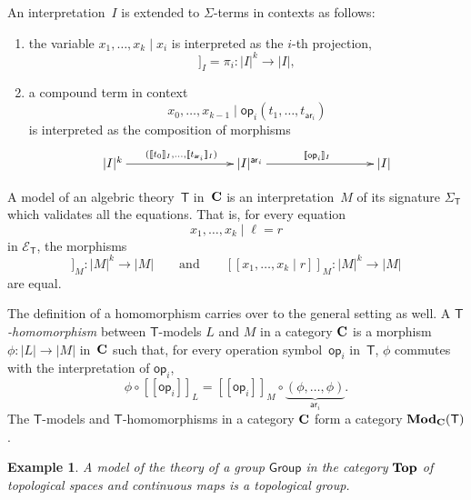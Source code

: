\documentclass{amsart}
\newcommand{\theory}[1]{\mathsf{#1}} %
\newcommand{\signature}[1]{\Sigma_{\theory{#1}}} %
\newcommand{\equations}[1]{\mathcal{E}_{\theory{#1}}} %
\newcommand{\ModC}[2]{\text{\textbf{Mod}}_{\category{#1}}(\theory{#2})} %
\newcommand{\category}[1]{\text{\textbf{#1}}} %
\newcommand{\op}[1]{\mathsf{op}_{#1}} %
\newcommand{\arity}[1]{\mathsf{ar}_{#1}} %
\newcommand{\sem}[1]{[\![#1]\!]} %
\newtheorem{example}[definition]{Example}
\begin{document}
An interpretation~$I$ is extended to $\Sigma$-terms in contexts as follows:
%
\begin{enumerate}
\item the variable $x_1, \ldots, x_k \mid x_i$ is interpreted as the $i$-th projection,
  \begin{equation*}
    \sem{x_0, \ldots, x_{k-1} \mid  x_i}_I = \pi_i : |I|^k \to |I|,
  \end{equation*}
\item a compound term in context
  \begin{equation*}
    x_0, \ldots, x_{k-1} \mid \op{i}(t_1, \ldots, t_{\arity{i}})
  \end{equation*}
  is interpreted as the composition of morphisms
  \begin{equation*}
    \xymatrix@+6em{
      {|I|^k} \ar[r]^{(\sem{t_0}_I, \ldots, \sem{t_{\arity{i}}}_I)}
      &
      {|I|^{\arity{i}}} \ar[r]^{\sem{\op{i}}_I}
      &
      {|I|}
    }
  \end{equation*}
\end{enumerate}
%
A model of an algebric theory~$\theory{T}$ in~$\category{C}$ is an interpretation~$M$ of
its signature $\signature{T}$ which validates all the equations. That is, for every
equation
%
\begin{equation*}
  x_1, \ldots, x_k \mid \ell = r
\end{equation*}
%
in $\equations{T}$, the morphisms
%
\begin{equation*}
  \sem{x_1, \ldots, x_k \mid \ell}_M : |M|^k \to |M|
  \qquad\text{and}\qquad
  \sem{x_1, \ldots, x_k \mid r}_M : |M|^k \to |M|
\end{equation*}
%
are equal.

The definition of a homomorphism carries over to the general setting as well. A
\emph{$\theory{T}$-homomorphism} between $\theory{T}$-models $L$ and $M$ in a category
$\category{C}$ is a morphism $\phi : |L| \to |M|$ in~$\category{C}$ such that, for every
operation symbol~$\op{i}$ in~$\theory{T}$, $\phi$ commutes with the interpretation of
$\op{i}$,
%
\begin{equation*}
  \phi \circ \sem{\op{i}}_L = \sem{\op{i}}_M \circ \underbrace{(\phi, \ldots, \phi)}_{\arity{i}}.
\end{equation*}
%
The $\theory{T}$-models and $\theory{T}$-homomorphisms in a category $\category{C}$ form a
category $\ModC{C}{T}$.

\begin{example}
  A model of the theory of a group $\theory{Group}$ in the category $\category{Top}$ of
  topological spaces and continuous maps is a topological group.
\end{example}
\end{document}
